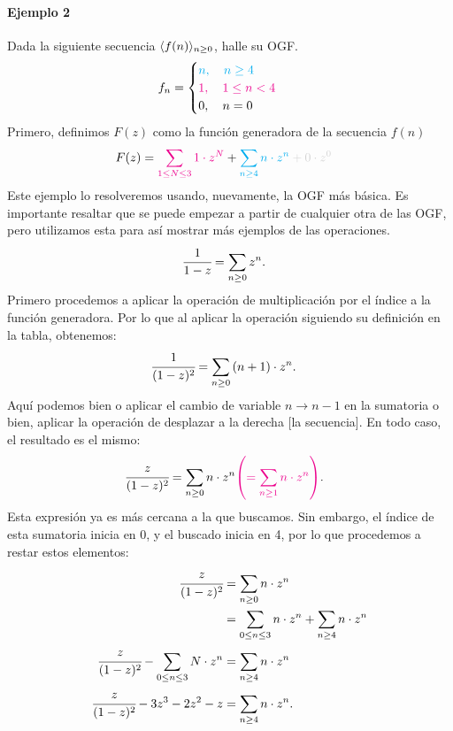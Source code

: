 \paragraph{Ejemplo 2}
Dada la siguiente secuencia $\langle f(n)\rangle_{n\geq 0}$, halle su OGF.
\begin{align*}
    f_n&=\begin{cases}
    {\color{cyan}n,\quad n\geq4}\\
    {\color{magenta}1,\quad 1\leq n < 4}\\
    0,\quad n=0
    \end{cases}
\end{align*}
Primero, definimos $F(z)$ como la función generadora de la secuencia $f(n)$
\begin{align*}
    F(z)&=\cmag{\sum_{1\leq N\leq 3}{1\cdot z^N}} + \cyan{\sum_{n\geq 4}{n\cdot z^n}} \color{gray!35}+ 0\cdot z^0
\end{align*}
Este ejemplo lo resolveremos usando, nuevamente, la OGF más básica. Es importante resaltar que se puede empezar a partir de cualquier otra de las OGF, pero utilizamos esta para así mostrar más ejemplos de las operaciones.
\begin{align*}
    \cfrac{1}{1-z}&=\sum_{n\geq0}{z^n}.
\end{align*}
Primero procedemos a aplicar la operación de multiplicación por el índice a la función generadora. Por lo que al aplicar la operación siguiendo su definición en la tabla, obtenemos:
\begin{align*}
    \cfrac{1}{(1-z)^2}&=\sum_{n\geq0}{(n+1)\cdot z^n}.
\end{align*}
Aquí podemos bien o aplicar el cambio de variable $n\xrightarrow{} n-1$ en la sumatoria o bien, aplicar la operación de desplazar a la derecha [la secuencia]. En todo caso, el resultado es el mismo:
\begin{align*}
    \cfrac{z}{(1-z)^2}&=\sum_{n\geq0}{n\cdot z^n} {\color{magenta}\left(=\sum_{n\geq1}{n\cdot z^n}\right)}.
\end{align*}
Esta expresión ya es más cercana a la que buscamos. Sin embargo, el índice de esta sumatoria inicia en 0, y el buscado inicia en 4, por lo que procedemos a restar estos elementos:
\begin{align*}
    \cfrac{z}{(1-z)^2}&=\sum_{n\geq0}{n\cdot z^n}\\
    &=\sum_{0\leq n\leq3}{n\cdot z^n}+\sum_{n\geq4}{n\cdot z^n}\\
    \cfrac{z}{(1-z)^2}-\sum_{0\leq n\leq3}{N\cdot z^n}&=\sum_{n\geq4}{n\cdot z^n}\\
    \cfrac{z}{(1-z)^2}-3z^3-2z^2-z&=\sum_{n\geq4}{n\cdot z^n}.
\end{align*}
